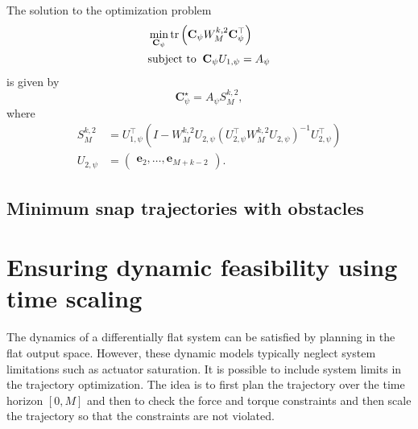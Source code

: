 \begin{theorem}
	The solution to the optimization problem
	\begin{equation}
		\label{eq:min_snap_no_obstacles_heading}
		\begin{aligned}
		&\min_{\mathbf{C}_\psi} \trace{\mathbf{C}_\psi W_M^{k,2} \mathbf{C}_\psi^\top} \\
		&\text{subject to } \: \mathbf{C}_\psi U_{1,\psi} = A_\psi
		\end{aligned}
	\end{equation}
	is given by
	\begin{equation}
		\mathbf{C}_\psi^\star  = A_\psi S_M^{k,2} ,
	\end{equation}
	where
	\begin{align*}
	S_M^{k,2} &= U_{1,\psi}^\top \left(I-W_M^{k,2}U_{2,\psi}(U_{2,\psi}^\top W_M^{k,2} U_{2,\psi})^{-1}U_{2,\psi}^\top\right) \\
	U_{2,\psi} &= \begin{pmatrix} \mathbf{e}_2, \dots, \mathbf{e}_{M+k-2} \end{pmatrix}.
	\end{align*}
\end{theorem}

\subsection{Minimum snap trajectories with obstacles}



\section{Ensuring dynamic feasibility using time scaling}
The dynamics of a differentially flat system can be satisfied by planning in the flat output space. 
However, these dynamic models typically neglect system limitations such as actuator saturation. 
It is possible to include system limits in the trajectory optimization. The idea is to first plan the trajectory over the time horizon $[0,M]$ and then to check the force and torque constraints and then scale the trajectory so that the constraints are not violated.  

